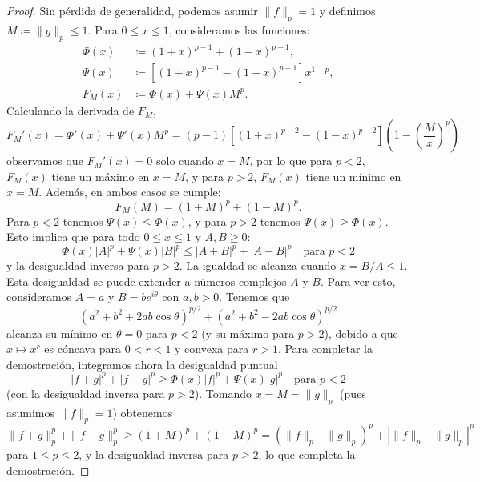 \begin{proof}
Sin pérdida de generalidad, podemos asumir $\|f\|_p = 1$ y definimos $M \coloneq \|g\|_p \leq 1$. Para $0 \leq x \leq 1$, consideramos las funciones:
\begin{align}
    \Phi(x) &\coloneq (1 + x)^{p-1} + (1 - x)^{p-1}, \\
    \Psi(x) &\coloneq \left[(1 + x)^{p-1} - (1 - x)^{p-1}\right] x^{1-p}, \\
    F_M(x) &\coloneq \Phi(x) + \Psi(x) M^p.
\end{align}
Calculando la derivada de $ F_M $, 
\begin{equation}
    F_M'(x) = \Phi'(x) + \Psi'(x) M^p = (p-1)\left[(1 + x)^{p-2} - (1 - x)^{p-2}\right]\left(1 - \left(\frac{M}{x}\right)^p\right)
\end{equation}
observamos que $F_M'(x) = 0$ solo cuando $x = M$, por lo que para $p < 2$, $F_M(x)$ tiene un máximo en $x = M$, y para $p > 2$, $F_M(x)$ tiene un mínimo en $x = M$. Además, en ambos casos se cumple:
\begin{equation}
    F_M(M) = (1 + M)^p + (1 - M)^p.
\end{equation}
Para $p < 2$ tenemos $\Psi(x) \leq \Phi(x)$, y para $p > 2$ tenemos $\Psi(x) \geq \Phi(x)$. Esto implica que para todo $0 \leq x \leq 1$ y $A, B \geq 0$:
\begin{equation}
    \Phi(x)|A|^p + \Psi(x)|B|^p \leq |A + B|^p + |A - B|^p \quad \text{para } p < 2
\end{equation}
y la desigualdad inversa para $p > 2$. La igualdad se alcanza cuando $x = B/A \leq 1$. Esta desigualdad se puede extender a números complejos $A$ y $B$. Para ver esto, consideramos $A = a$ y $B = b e^{i\theta}$ con $a, b > 0$. Tenemos que
\begin{equation}
    (a^2 + b^2 + 2ab \cos \theta)^{p/2} + (a^2 + b^2 - 2ab \cos \theta)^{p/2}
\end{equation}
alcanza su mínimo en $\theta = 0$ para $p < 2$ (y su máximo para $p > 2$), debido a que $x \mapsto x^{r}$ es cóncava para $0 < r < 1$ y convexa para $r > 1$. Para completar la demostración, integramos ahora la desigualdad puntual
\begin{equation}
    |f + g|^p + |f - g|^p \geq \Phi(x)|f|^p + \Psi(x)|g|^p \quad \text{para } p < 2
\end{equation}
(con la desigualdad inversa para $p > 2$). Tomando $x = M = \|g\|_p$ (pues asumimos $\|f\|_p = 1$) obtenemos
\begin{equation}
    \|f + g\|_p^p + \|f - g\|_p^p \geq (1 + M)^p + (1 - M)^p = (\|f\|_p + \|g\|_p)^p + |\|f\|_p - \|g\|_p|^p
\end{equation}
para $1 \leq p \leq 2$, y la desigualdad inversa para $p \geq 2$, lo que completa la demostración.
\end{proof}

